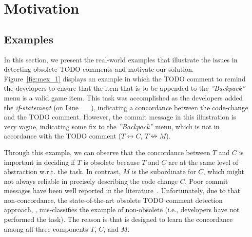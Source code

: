 
\section{Motivation}
\label{intro:sec}

\subsection{Examples}
\label{examples:sec}

In this section, we present the real-world examples that illustrate
the issues in detecting obsolete TODO comments and motivate our
solution. Figure~\ref{fig:mex_1} displays an example in which the TODO
comment to remind the developers to ensure that the item that is to be
appended to the {\em''Backpack''} menu is a valid game item. This task
was accomplished as the developers added the {\em if-statement} (on
Line \_\_), indicating a concordance between the code-change and the
TODO comment. However, the commit message in this illustration is very
vague, indicating some fix to the {\em''Backpack''} menu, which is not
in accordance with the TODO comment ($T \leftrightarrow C$, $T
\nleftrightarrow M$).

 Through this example, we can observe
that the concordance between $T$ and $C$ is important in deciding if
$T$ is obsolete because $T$ and $C$ are at the same level of
abstraction w.r.t. the task. In contrast, $M$ is the subordinate for
$C$, which might not always reliable in precisely describing the code
change $C$. Poor commit messages have been well reported in the
literature~\cite{icse13}. Unfortunately, due to that non-concordance,
the state-of-the-art obsolete TODO comment detection approach,
\tdcleaner \cite{tdcleaner-fse21}, mis-classifies the example of
non-obsolete (i.e., developers have not performed the task).  The
reason is that \tdcleaner is designed to learn the concordance among
all three components $T$, $C$, and $M$.



